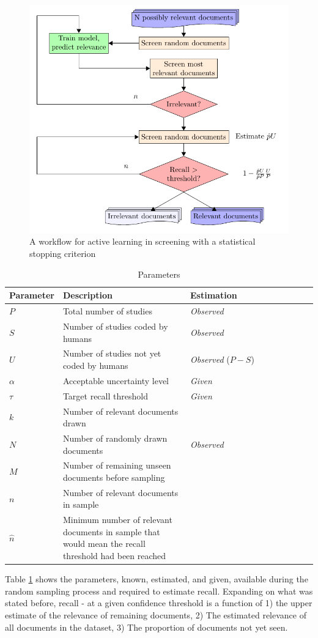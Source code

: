 \documentclass{bmcart}
\begin{document}
	\begin{figure}
		\includegraphics[width=0.5\linewidth]{../images/flow}
		\caption{A workflow for active learning in screening with a statistical stopping criterion}
		\label{flow}
	\end{figure}
	
	\begin{table}
		\begin{tabular}{p{0.15\linewidth} p{0.425\linewidth} p{0.425\linewidth}}
			Parameter & Description & Estimation \\
			\hline
			$ P  $ &  Total number of studies & \textit{Observed} \\
			$ S $ & Number of studies coded by humans & \textit{Observed} \\
			$ U $ & Number of studies not yet coded by humans & \textit{Observed} ($P - S$) \\
			$ \alpha $ & Acceptable uncertainty level & \textit{Given} \\
			$ \tau $ & Target recall threshold & \textit{Given} \\
			$ k $ & Number of relevant documents drawn & \\
			$ N $ & Number of randomly drawn documents & \textit{Observed} \\
			$ M $ & Number of remaining unseen documents before sampling & \\
			$ n $ & Number of relevant documents in sample & \\
			$ \hat{n} $ & Minimum number of relevant documents in sample that would mean the recall threshold had been reached  & \\
		\end{tabular}
		\caption{Parameters}
		\label{parameters}
	\end{table}

	


	
	Table \ref{parameters} shows the parameters, known, estimated, and given, available during the random sampling process and required to estimate recall. 
	Expanding on what was stated before, recall - at a given confidence threshold is a function of 1) the upper estimate of the relevance of remaining documents, 2) The estimated relevance of all documents in the dataset, 3) The proportion of documents not yet seen. 
	
\end{document}
